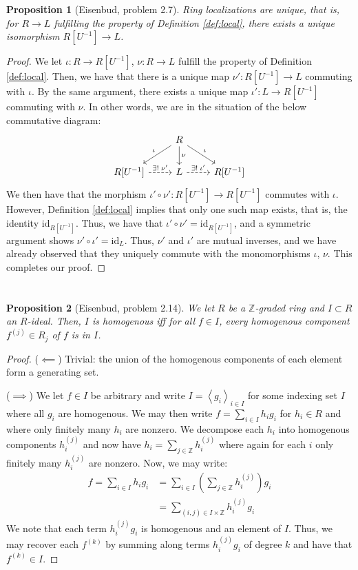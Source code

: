 \documentclass[english]{article}
\newcommand{\ZZ}{\mathbb{Z}}
\newcommand{\prob}[1]{\setcounter{section}{#1-1}\section{}}
\newtheorem*{prop*}{Proposition}
\theoremstyle{remark}
\theoremstyle{definition}
\newcommand{\idl}[1]{\left\langle{#1}\right\rangle }
\newcommand{\id}{\mathrm{id}}
\begin{document}
\begin{prop*}[Eisenbud, problem 2.7]
	Ring localizations are unique, that is, for $R\to L$ fulfilling the property of Definition \ref{def:local}, there exists a unique isomorphism $R[U^{-1}]\to L$. 
\end{prop*}
\begin{proof}
	We let $\iota: R\to R[U^{-1}]$, $\nu: R\to L$ fulfill the property of Definition \ref{def:local}. Then, we have that there is a unique map $\nu': R[U^{-1}]\to L$ commuting with $\iota$. By the same argument, there exists a unique map $\iota': L\to R[U^{-1}]$ commuting with $\nu$. In other words, we are in the situation of the below commutative diagram: 
	$$
	\begin{tikzcd}
	&R\arrow[dl,swap,"\iota"]\arrow[d,"\nu"]\arrow[dr,"\iota"]&\\
	R[U^{-1}]\arrow[r,dashrightarrow,"\exists!\;\nu'"]&L\arrow[r,dashrightarrow,"\exists!\;\iota'"]&R[U^{-1}]
	\end{tikzcd}$$
	We then have that the morphism $\iota'\circ\nu':R[U^{-1}]\to R[U^{-1}]$ commutes with $\iota$. However, Definition \ref{def:local} implies that only one such map exists, that is, the identity $\id_{R[U^{-1}]}$. Thus, we have that $\iota'\circ\nu'=\id_{R[U^{-1}]}$, and a symmetric argument shows $\nu'\circ\iota'=\id_{L}$. Thus, $\nu'$ and $\iota'$ are mutual inverses, and we have already observed that they uniquely commute with the monomorphisms $\iota$, $\nu$. This completes our proof.
\end{proof}
\prob{6}\begin{prop*}[Eisenbud, problem 2.14]
	We let $R$ be a $\ZZ$-graded ring and $I\subset R$ an $R$-ideal. Then, $I$ is homogenous iff for all $f\in I$, every homogenous component $f^{(j)}\in R_j$ of $f$ is in $I$. 
\end{prop*}
\begin{proof}
	($\impliedby$) Trivial: the union of the homogenous components of each element form a generating set.
	
	($\implies$) We let $f\in I$ be arbitrary and write $I=\idl{g_i}_{i\in I}$ for some indexing set $I$ where all $g_i$ are homogenous. We may then write $f=\sum_{i\in I}h_ig_i$ for $h_i\in R$ and where only finitely many $h_i$ are nonzero. We decompose each $h_i$ into homogenous components $h_{i}^{(j)}$ and now have $h_i=\sum_{j\in \ZZ}h_i^{(j)}$ where again for each $i$ only finitely many $h_i^{(j)}$ are nonzero. Now, we may write:
	\begin{align*}
		f=\sum_{i\in I}h_ig_i&=\sum_{i\in I}\left(\sum_{j\in \ZZ}h_i^{(j)}\right)g_i\\
	&=\sum_{(i,j)\in I\times \ZZ}h_i^{(j)}g_i
	\end{align*} 
	We note that each term $h_i^{(j)}g_i$ is homogenous and an element of $I$. Thus, we may recover each $f^{(k)}$ by summing along terms $h_i^{(j)}g_i$ of degree $k$ and have that $f^{(k)}\in I$. 
\end{proof}
\end{document}
